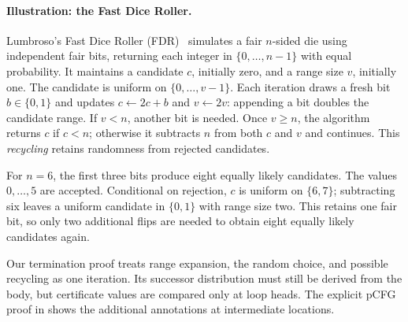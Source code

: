 \paragraph{Illustration: the Fast Dice Roller.}
Lumbroso's Fast Dice Roller
(FDR)~\cite{DBLP:journals/corr/abs-1304-1916} simulates a fair $n$-sided
die using independent fair bits, returning each integer in
$\{0,\ldots,n-1\}$ with equal probability.
It maintains a candidate $c$, initially zero, and a range size $v$,
initially one. The candidate is uniform on $\{0,\ldots,v-1\}$.
Each iteration draws a fresh bit $b\in\{0,1\}$ and updates
$c\gets2c+b$ and $v\gets2v$: appending a bit doubles the candidate range.
If $v<n$, another bit is needed. Once $v\geq n$, the algorithm returns
$c$ if $c<n$; otherwise it subtracts $n$ from both $c$ and $v$ and
continues. This \emph{recycling} retains randomness from rejected candidates.

For $n=6$, the first three bits produce eight equally likely candidates.
The values $0,\ldots,5$ are accepted. Conditional on rejection, $c$ is
uniform on $\{6,7\}$; subtracting six leaves a uniform candidate in
$\{0,1\}$ with range size two. This retains one fair bit, so only two
additional flips are needed to obtain eight equally likely candidates again.

Our termination proof treats range expansion, the random choice, and
possible recycling as one iteration. Its successor distribution must
still be derived from the body, but certificate values are compared only
at loop heads. The explicit pCFG proof in 
shows the additional annotations at intermediate locations.

